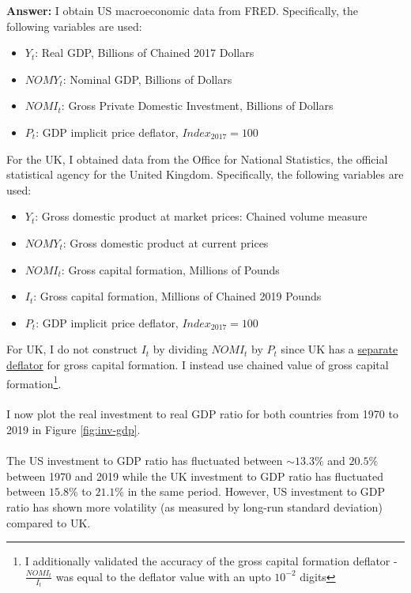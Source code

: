 \documentclass[12pt]{article}
\theoremstyle{mytheoremstyle}
\theoremstyle{mytheoremstyle}
\theoremstyle{myproblemstyle}
\begin{document}
\textbf{Answer:} I obtain US macroeconomic data from FRED. Specifically, the following variables are used:
\begin{itemize}
    \item $Y_t$: Real GDP, Billions of Chained 2017 Dollars
    \item $NOMY_t$: Nominal GDP, Billions of Dollars
    \item $NOMI_t$: Gross Private Domestic Investment, Billions of Dollars
    \item $P_t$: GDP implicit price deflator, $Index_{2017} = 100$
\end{itemize}

For the UK, I obtained data from the Office for National Statistics, the official statistical agency for the United Kingdom. Specifically, the following variables are used: 

\begin{itemize}
    \item $Y_t$: Gross domestic product at market prices: Chained volume measure
    \item $NOMY_t$:  Gross domestic product at current prices
    \item $NOMI_t$: Gross capital formation, Millions of Pounds
    \item $I_t$: Gross capital formation, Millions of Chained 2019 Pounds
    \item $P_t$: GDP implicit price deflator, $Index_{2017} = 100$
\end{itemize}

\noindent For UK, I do not construct $I_t$ by dividing $NOMI_t$ by $P_t$ since UK has a \href{https://www.ons.gov.uk/economy/grossdomesticproductgdp/timeseries/ybfu/ukea}{separate deflator} for gross capital formation. I instead use chained value of gross capital formation\footnote{I additionally validated the accuracy of the gross capital formation deflator - $\frac{NOMI_t}{I_t}$ was equal to the deflator value with an upto $10^{-2}$ digits}.
\\ \\ 
\noindent I now plot the real investment to real GDP ratio for both countries from 1970 to 2019 in Figure \ref{fig:inv-gdp}. 
\\ \\ 
The US investment to GDP ratio has fluctuated between $\sim 13.3\% $ and $20.5\%$ between 1970 and 2019 while the UK investment to GDP ratio has fluctuated between $15.8\%$ to $21.1\%$ in the same period. However, US investment to GDP ratio has shown more volatility (as measured by long-run standard deviation) compared to UK.
\end{document}
